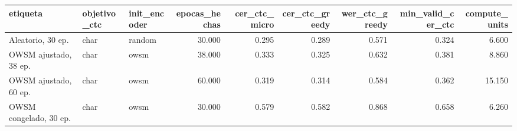 \begin{tabular}{lllrrrrrr}
\toprule
etiqueta & objetivo_ctc & init_encoder & epocas_hechas & cer_ctc_micro & cer_ctc_greedy & wer_ctc_greedy & min_valid_cer_ctc & compute_units \\
\midrule
Aleatorio, 30 ep. & char & random & 30.000 & 0.295 & 0.289 & 0.571 & 0.324 & 6.600 \\
OWSM ajustado, 38 ep. & char & owsm & 38.000 & 0.333 & 0.325 & 0.632 & 0.381 & 8.860 \\
OWSM ajustado, 60 ep. & char & owsm & 60.000 & 0.319 & 0.314 & 0.584 & 0.362 & 15.150 \\
OWSM congelado, 30 ep. & char & owsm & 30.000 & 0.579 & 0.582 & 0.868 & 0.658 & 6.260 \\
\bottomrule
\end{tabular}
